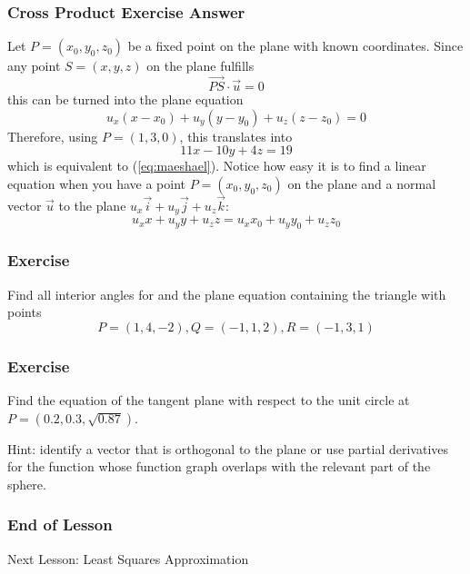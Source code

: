 \documentclass[xcolor=dvipsnames]{beamer}
\begin{document}
\begin{frame}
  \frametitle{Cross Product Exercise Answer}
  Let $P=(x_{0},y_{0},z_{0})$ be a fixed point on the plane with known
  coordinates. Since any point $S=(x,y,z)$ on the plane fulfills
\begin{equation}
  \label{eq:iefeeboh}
  \vec{PS}\cdot\vec{u}=0
\end{equation}
this can be turned into the plane equation
\begin{equation}
  \label{eq:vetiexup}
  u_{x}(x-x_{0})+u_{y}(y-y_{0})+u_{z}(z-z_{0})=0
\end{equation}
Therefore, using $P=(1,3,0)$, this translates into
\begin{equation}
  \label{eq:eechawoi}
11x-10y+4z=19  
\end{equation}
which is equivalent to (\ref{eq:maeshael}). Notice how easy it is to
find a linear equation when you have a point $P=(x_{0},y_{0},z_{0})$
on the plane and a normal vector $\vec{u}$ to the plane
$u_{x}\vec{i}+u_{y}\vec{j}+u_{z}\vec{k}$:
\begin{equation}
  \label{eq:quaghoob}
u_{x}x+u_{y}y+u_{z}z=u_{x}x_{0}+u_{y}y_{0}+u_{z}z_{0}
\end{equation}
\end{frame}

\begin{frame}
  \frametitle{Exercise}
  {\ubung} Find all interior angles for and the plane equation
  containing the triangle with points
  \begin{equation}
    \label{eq:yeibieba}
    P=(1,4,-2),Q=(-1,1,2),R=(-1,3,1)
  \end{equation}
\end{frame}

\begin{frame}
  \frametitle{Exercise}
  {\ubung} Find the equation of the tangent plane with respect to the
  unit circle at $P=(0.2,0.3,\sqrt{0.87})$.

  \medskip

  Hint: identify a vector that is orthogonal to the plane or use
  partial derivatives for the function whose function graph overlaps
  with the relevant part of the sphere.
\end{frame}

\begin{frame}
  \frametitle{End of Lesson}
Next Lesson: Least Squares Approximation
\end{frame}
\end{document}
